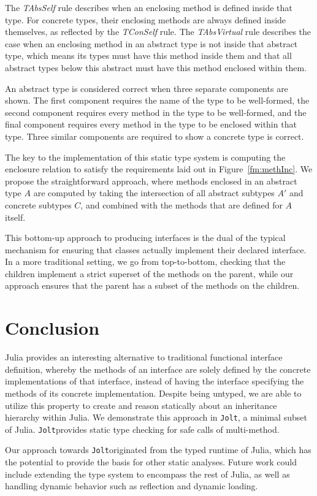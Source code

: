\documentclass[preprint]{sigplanconf}
\newcommand{\xt}[1]{\texttt{#1}}
\newcommand{\jolt}{\xt{Jolt}}
\begin{document}
The \textit{TAbsSelf} rule describes when an enclosing method is defined inside that type. 
For concrete types, their enclosing methods are always defined inside themselves, as reflected by the \textit{TConSelf} rule.
The \textit{TAbsVirtual} rule describes the case when an enclosing method in an abstract type 
is not inside that abstract type, which means its types must have this method inside them
and that all abstract types below this abstract must have this method enclosed within them.

An abstract type is considered correct when three separate components are shown. The first component requires the name of the type to be well-formed, 
the second component requires every method in the type to be well-formed, and the final component requires every method in the type to be enclosed within that type. 
Three similar components are required to show a concrete type is correct.

The key to the implementation of this static type system is computing the 
enclosure relation to satisfy the requirements laid out in Figure~\ref{fm:methInc}.
We propose the straightforward approach, where methods enclosed in an
abstract type $A$ are computed by taking the intersection of all abstract subtypes
$A'$ and concrete subtypes $C$, and combined with the methods that are defined for $A$
itself. 

This bottom-up approach to producing interfaces is the dual of the typical mechanism
for ensuring that classes actually implement their declared interface. In a more
traditional setting, we go from top-to-bottom, checking that the children 
implement a strict superset of the methods on the parent, while our approach 
ensures that the parent has a subset of the methods on the children.

\section{Conclusion}

Julia provides an interesting alternative to traditional functional interface 
definition, whereby the methods of an interface are solely defined by 
the concrete implementations of that interface, instead of having the interface specifying
the methods of its concrete implementation. Despite being
untyped, we are able to utilize this property to create and reason statically about an inheritance
hierarchy within Julia. We demonstrate this approach in \jolt\space, a minimal subset
of Julia. \jolt\space provides static type checking for safe calls of multi-method.

Our approach towards \jolt\space originated from the typed runtime of Julia, which has the potential to
provide the basis for other static analyses. Future work could include extending
the type system to encompass the rest of Julia, as well as handling dynamic 
behavior such as reflection and dynamic loading.



\end{document}
